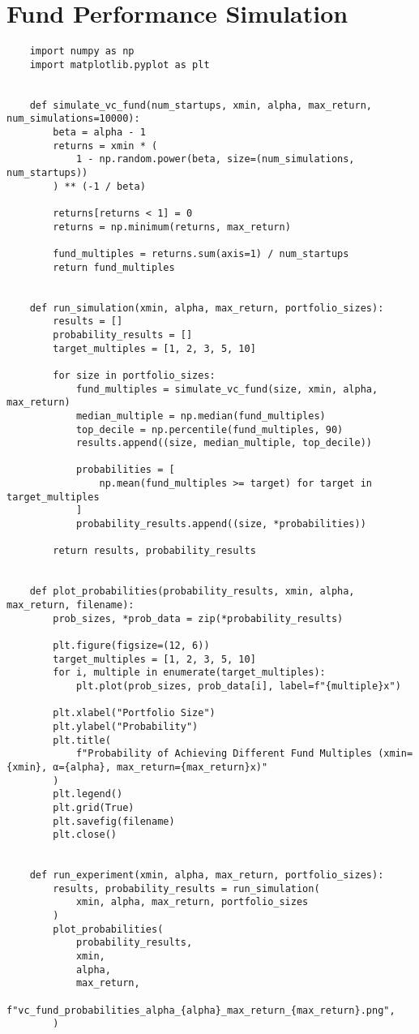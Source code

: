 \documentclass[a4paper, oneside]{discothesis}
\begin{document}
\chapter{Fund Performance Simulation}
\begin{verbatim}
    import numpy as np
    import matplotlib.pyplot as plt
    
    
    def simulate_vc_fund(num_startups, xmin, alpha, max_return, num_simulations=10000):
        beta = alpha - 1
        returns = xmin * (
            1 - np.random.power(beta, size=(num_simulations, num_startups))
        ) ** (-1 / beta)
    
        returns[returns < 1] = 0
        returns = np.minimum(returns, max_return)
    
        fund_multiples = returns.sum(axis=1) / num_startups
        return fund_multiples
    
    
    def run_simulation(xmin, alpha, max_return, portfolio_sizes):
        results = []
        probability_results = []
        target_multiples = [1, 2, 3, 5, 10]
    
        for size in portfolio_sizes:
            fund_multiples = simulate_vc_fund(size, xmin, alpha, max_return)
            median_multiple = np.median(fund_multiples)
            top_decile = np.percentile(fund_multiples, 90)
            results.append((size, median_multiple, top_decile))
    
            probabilities = [
                np.mean(fund_multiples >= target) for target in target_multiples
            ]
            probability_results.append((size, *probabilities))
    
        return results, probability_results
    
    
    def plot_probabilities(probability_results, xmin, alpha, max_return, filename):
        prob_sizes, *prob_data = zip(*probability_results)
    
        plt.figure(figsize=(12, 6))
        target_multiples = [1, 2, 3, 5, 10]
        for i, multiple in enumerate(target_multiples):
            plt.plot(prob_sizes, prob_data[i], label=f"{multiple}x")
    
        plt.xlabel("Portfolio Size")
        plt.ylabel("Probability")
        plt.title(
            f"Probability of Achieving Different Fund Multiples (xmin={xmin}, α={alpha}, max_return={max_return}x)"
        )
        plt.legend()
        plt.grid(True)
        plt.savefig(filename)
        plt.close()
    
    
    def run_experiment(xmin, alpha, max_return, portfolio_sizes):
        results, probability_results = run_simulation(
            xmin, alpha, max_return, portfolio_sizes
        )
        plot_probabilities(
            probability_results,
            xmin,
            alpha,
            max_return,
            f"vc_fund_probabilities_alpha_{alpha}_max_return_{max_return}.png",
        )
    

\end{verbatim}
\end{document}
